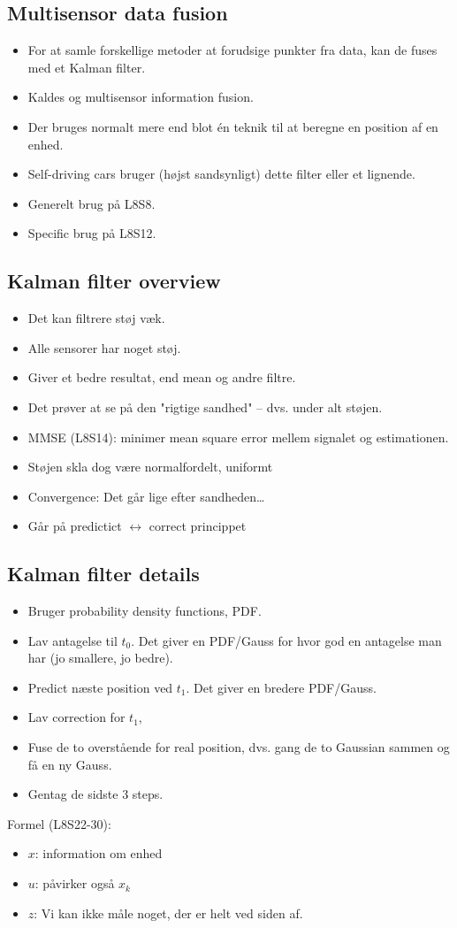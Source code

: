 \documentclass[oneside, 10pt]{article}
\begin{document}
\subsection{Multisensor data fusion}
\begin{itemize}
	\item For at samle forskellige metoder at forudsige punkter fra data, kan de fuses med et Kalman filter.
	\item Kaldes og multisensor information fusion.
	\item Der bruges normalt mere end blot én teknik til at beregne en position af en enhed.
	\item Self-driving cars bruger (højst sandsynligt) dette filter eller et lignende.
	\item Generelt brug på L8S8.
	\item Specific brug på L8S12.
\end{itemize}




\subsection{Kalman filter overview}
\begin{itemize}
	\item Det kan filtrere støj væk.
	\item Alle sensorer har noget støj.
	\item Giver et bedre resultat, end mean og andre filtre.
	\item Det prøver at se på den "rigtige sandhed" -- dvs. under alt støjen.
	\item MMSE (L8S14): minimer mean square error mellem signalet og estimationen.
	\item Støjen skla dog være normalfordelt, uniformt
	\item Convergence: Det går lige efter sandheden\dots
	\item Går på predictict $\leftrightarrow$ correct princippet
\end{itemize}



\subsection{Kalman filter details}

\begin{itemize}
	\item Bruger probability density functions, PDF.
	\item Lav antagelse til $t_0$. Det giver en PDF/Gauss for hvor god en antagelse man har (jo smallere, jo bedre).
	\item Predict næste position ved $t_1$. Det giver en bredere PDF/Gauss.
	\item Lav correction for $t_1$,
	\item Fuse de to overstående for real position, dvs. gang de to Gaussian sammen og få en ny Gauss.
	\item Gentag de sidste 3 steps.
\end{itemize}

Formel (L8S22-30):
\begin{itemize}
	\item $x$: information om enhed
	\item $u$: påvirker også $x_k$
	\item $z$: Vi kan ikke måle noget, der er helt ved siden af.
\end{itemize}
\end{document}
